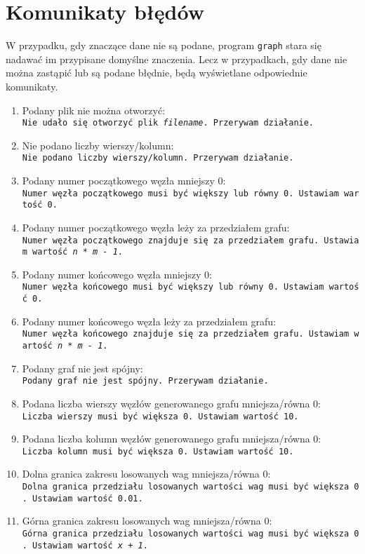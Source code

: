 \documentclass[]{article}
\begin{document}
\section{Komunikaty błędów}\label{header-n281}

W przypadku, gdy znaczące dane nie są podane, program \texttt{graph} stara się nadawać im przypisane domyślne znaczenia. Lecz w przypadkach, gdy dane nie można zastąpić lub są podane błędnie, będą wyświetlane odpowiednie komunikaty.

\begin{enumerate}
\def\labelenumi{\arabic{enumi}.}
\item
  Podany plik nie można otworzyć:
  \texttt{Nie\ udało\ się\ otworzyć\ plik\ \emph{filename}.\ Przerywam\ działanie.}
\item
  Nie podano liczby wierszy/kolumn:
  \texttt{Nie\ podano\ liczby\ wierszy\texttt{/}kolumn.\ Przerywam\ działanie. }
\item
  Podany numer początkowego węzła mniejszy 0:
  \texttt{Numer\ węzła\ początkowego\ musi\ być\ większy\ lub\ równy\ 0.\ Ustawiam\ wartość\ 0.}
\item
  Podany numer początkowego węzła leży za przedziałem grafu:
  \texttt{Numer\ węzła\ początkowego\ znajduje\ się\ za\ przedziałem\ grafu.\ Ustawiam\ wartość\ \emph{n * m - 1}.}
\item
  Podany numer końcowego węzła mniejszy 0:
  \texttt{Numer\ węzła\ końcowego\ musi\ być\ większy\ lub\ równy\ 0.\ Ustawiam\ wartość\ 0.}
\item
  Podany numer końcowego węzła leży za przedziałem grafu:
  \texttt{Numer\ węzła\ końcowego\ znajduje\ się\ za\ przedziałem\ grafu.\ Ustawiam\ wartość\ \emph{n * m - 1}.}
\item
  Podany graf nie jest spójny:
  \texttt{Podany\ graf\ nie\ jest\ spójny.\ Przerywam\ działanie.}
\item
  Podana liczba wierszy węzłów generowanego grafu mniejsza/równa 0:
  \texttt{Liczba\ wierszy\ musi\ być\ większa\ 0.\ Ustawiam\ wartość\ 10.}
\item
  Podana liczba kolumn węzłów generowanego grafu mniejsza/równa 0:
  \texttt{Liczba\ kolumn\ musi\ być\ większa\ 0.\ Ustawiam\ wartość\ 10.}
\item
  Dolna granica zakresu losowanych wag mniejsza/równa 0:
  \texttt{Dolna\ granica\ przedziału\ losowanych\ wartości\ wag\ musi\ być\ większa\ 0.\ Ustawiam\ wartość\ 0.01.}
\item
  Górna granica zakresu losowanych wag mniejsza/równa 0:
  \texttt{Górna\ granica\ przedziału\ losowanych\ wartości\ wag\ musi\ być\ większa\ 0.\ Ustawiam\ wartość\ \emph{x + 1}.}
\end{enumerate}
\end{document}
